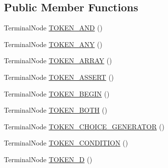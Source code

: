 \subsection*{Public Member Functions}
\begin{DoxyCompactItemize}
\item 
Terminal\+Node \hyperlink{classgov_1_1nasa_1_1jpf_1_1inspector_1_1server_1_1expression_1_1parser_1_1_expression_grammar_pad664d42a2aee14226e172b869b9ffb3b_ad2b02b41828cba65ca4371fb80469480}{T\+O\+K\+E\+N\+\_\+\+A\+ND} ()
\item 
Terminal\+Node \hyperlink{classgov_1_1nasa_1_1jpf_1_1inspector_1_1server_1_1expression_1_1parser_1_1_expression_grammar_pad664d42a2aee14226e172b869b9ffb3b_adb618cd93fedb6808d8434bee454013f}{T\+O\+K\+E\+N\+\_\+\+A\+NY} ()
\item 
Terminal\+Node \hyperlink{classgov_1_1nasa_1_1jpf_1_1inspector_1_1server_1_1expression_1_1parser_1_1_expression_grammar_pad664d42a2aee14226e172b869b9ffb3b_a93ec495d4caf70c484bf001d2585ee09}{T\+O\+K\+E\+N\+\_\+\+A\+R\+R\+AY} ()
\item 
Terminal\+Node \hyperlink{classgov_1_1nasa_1_1jpf_1_1inspector_1_1server_1_1expression_1_1parser_1_1_expression_grammar_pad664d42a2aee14226e172b869b9ffb3b_a9be0eaea740a01cf9d85feeabfce6e1f}{T\+O\+K\+E\+N\+\_\+\+A\+S\+S\+E\+RT} ()
\item 
Terminal\+Node \hyperlink{classgov_1_1nasa_1_1jpf_1_1inspector_1_1server_1_1expression_1_1parser_1_1_expression_grammar_pad664d42a2aee14226e172b869b9ffb3b_ac6d840ffbbc24366728efd32683e68c7}{T\+O\+K\+E\+N\+\_\+\+B\+E\+G\+IN} ()
\item 
Terminal\+Node \hyperlink{classgov_1_1nasa_1_1jpf_1_1inspector_1_1server_1_1expression_1_1parser_1_1_expression_grammar_pad664d42a2aee14226e172b869b9ffb3b_a478e5e8601e948531877d4cb8b470dd2}{T\+O\+K\+E\+N\+\_\+\+B\+O\+TH} ()
\item 
Terminal\+Node \hyperlink{classgov_1_1nasa_1_1jpf_1_1inspector_1_1server_1_1expression_1_1parser_1_1_expression_grammar_pad664d42a2aee14226e172b869b9ffb3b_a963f1f00b0faec183faee01a2144877a}{T\+O\+K\+E\+N\+\_\+\+C\+H\+O\+I\+C\+E\+\_\+\+G\+E\+N\+E\+R\+A\+T\+OR} ()
\item 
Terminal\+Node \hyperlink{classgov_1_1nasa_1_1jpf_1_1inspector_1_1server_1_1expression_1_1parser_1_1_expression_grammar_pad664d42a2aee14226e172b869b9ffb3b_acc0455c4fd111f0cb478263636fc7b08}{T\+O\+K\+E\+N\+\_\+\+C\+O\+N\+D\+I\+T\+I\+ON} ()
\item 
Terminal\+Node \hyperlink{classgov_1_1nasa_1_1jpf_1_1inspector_1_1server_1_1expression_1_1parser_1_1_expression_grammar_pad664d42a2aee14226e172b869b9ffb3b_ad17dce5b830bdd8fc43c9fb661d9b2bf}{T\+O\+K\+E\+N\+\_\+D} ()

\end{DoxyCompactItemize}
